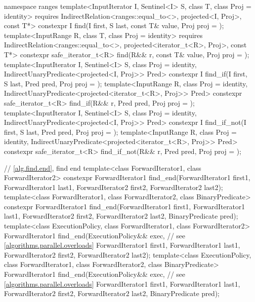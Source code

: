 \begin{codeblock}
{  namespace ranges {
    template<InputIterator I, Sentinel<I> S, class T, class Proj = identity>
      requires IndirectRelation<ranges::equal_to<>, projected<I, Proj>, const T*>
      constexpr I find(I first, S last, const T& value, Proj proj = {});
    template<InputRange R, class T, class Proj = identity>
      requires IndirectRelation<ranges::equal_to<>, projected<iterator_t<R>, Proj>, const T*>
      constexpr safe_iterator_t<R>
        find(R&& r, const T& value, Proj proj = {});
    template<InputIterator I, Sentinel<I> S, class Proj = identity,
             IndirectUnaryPredicate<projected<I, Proj>> Pred>
      constexpr I find_if(I first, S last, Pred pred, Proj proj = {});
    template<InputRange R, class Proj = identity,
             IndirectUnaryPredicate<projected<iterator_t<R>, Proj>> Pred>
      constexpr safe_iterator_t<R>
        find_if(R&& r, Pred pred, Proj proj = {});
    template<InputIterator I, Sentinel<I> S, class Proj = identity,
             IndirectUnaryPredicate<projected<I, Proj>> Pred>
      constexpr I find_if_not(I first, S last, Pred pred, Proj proj = {});
    template<InputRange R, class Proj = identity,
             IndirectUnaryPredicate<projected<iterator_t<R>, Proj>> Pred>
      constexpr safe_iterator_t<R>
        find_if_not(R&& r, Pred pred, Proj proj = {});
  }

  // \ref{alg.find.end}, find end
  template<class ForwardIterator1, class ForwardIterator2>
    constexpr ForwardIterator1
      find_end(ForwardIterator1 first1, ForwardIterator1 last1,
               ForwardIterator2 first2, ForwardIterator2 last2);
  template<class ForwardIterator1, class ForwardIterator2, class BinaryPredicate>
    constexpr ForwardIterator1
      find_end(ForwardIterator1 first1, ForwardIterator1 last1,
               ForwardIterator2 first2, ForwardIterator2 last2,
               BinaryPredicate pred);
  template<class ExecutionPolicy, class ForwardIterator1, class ForwardIterator2>
    ForwardIterator1
      find_end(ExecutionPolicy&& exec, // see \ref{algorithms.parallel.overloads}
               ForwardIterator1 first1, ForwardIterator1 last1,
               ForwardIterator2 first2, ForwardIterator2 last2);
  template<class ExecutionPolicy, class ForwardIterator1,
           class ForwardIterator2, class BinaryPredicate>
    ForwardIterator1
      find_end(ExecutionPolicy&& exec, // see \ref{algorithms.parallel.overloads}
               ForwardIterator1 first1, ForwardIterator1 last1,
               ForwardIterator2 first2, ForwardIterator2 last2,
               BinaryPredicate pred);

}
\end{codeblock}
